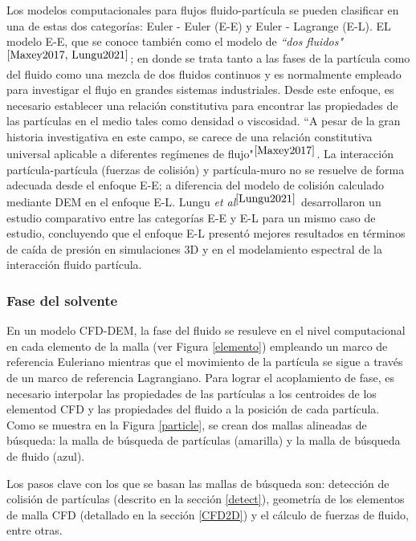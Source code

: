 Los modelos computacionales para flujos fluido-part\'icula se pueden clasificar en una de estas dos categor\'ias: Euler - Euler (E-E) y Euler - Lagrange (E-L). EL modelo E-E, que se conoce tambi\'en como el modelo de \textit{``dos fluidos"}$^{\cite{Maxey2017, Lungu2021}}$; en donde se trata tanto a las fases de la part\'icula como del fluido como una mezcla de dos fluidos continuos y es normalmente empleado para investigar el flujo en grandes sistemas industriales. Desde este enfoque, es necesario establecer una relaci\'on constitutiva para encontrar las propiedades de las part\'iculas en el medio tales como densidad o viscosidad. ``A pesar de la gran historia investigativa en este campo, se carece de una relaci\'on constitutiva universal aplicable a diferentes reg\'imenes de flujo"$^{\cite{Maxey2017}}$. La interacci\'on part\'icula-part\'icula (fuerzas de colisi\'on) y part\'icula-muro no se resuelve de forma adecuada desde el enfoque E-E; a diferencia del modelo de colisi\'on calculado mediante DEM en el enfoque E-L. Lungu \textit{et al}$^{\cite{Lungu2021}}$ desarrollaron un estudio comparativo entre las categor\'ias E-E y E-L para un mismo caso de estudio, concluyendo que el enfoque E-L present\'o mejores resultados en t\'erminos de ca\'ida de presi\'on en simulaciones 3D y en el modelamiento espectral de la interacci\'on fluido part\'icula.

\subsubsection{Fase del solvente}

\noindent
\justify

En un modelo CFD-DEM, la fase del fluido se resuleve en el nivel computacional en cada elemento de la malla (ver Figura \ref{elemento}) empleando un marco de referencia Euleriano mientras que el movimiento de la part\'icula se sigue a trav\'es de un marco de referencia Lagrangiano. Para lograr el acoplamiento de fase, es necesario interpolar las propiedades de las part\'iculas a los centroides de los elementod CFD y las propiedades del fluido a la posici\'on de cada part\'icula. Como se muestra en la Figura \ref{particle}, se crean dos mallas alineadas de b\'usqueda: la malla de b\'usqueda de part\'iculas (amarilla) y la malla de b\'usqueda de fluido (azul). 



\noindent
\justify

Los pasos clave con los que se basan las mallas de b\'usqueda son: detecci\'on de colisi\'on de part\'iculas (descrito en la secci\'on \ref{detect}), geometr\'ia de los elementos de malla CFD (detallado en la secci\'on \ref{CFD2D}) y el c\'alculo de fuerzas de fluido, entre otras.

